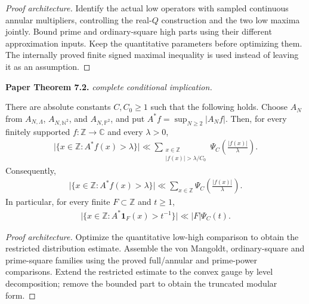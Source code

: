 \begin{proof}[Proof architecture]
\leanok
Identify the actual low operators with sampled continuous annular multipliers, controlling the real-$Q$ construction and the two low maxima jointly. Bound prime and ordinary-square high parts using their different approximation inputs. Keep the quantitative parameters before optimizing them. The internally proved finite signed maximal inequality is used instead of leaving it as an assumption.
\end{proof}

\begin{theorem}
\label{orlicz_maximal}
\leanok
\par\medskip\noindent\textbf{Paper Theorem 7.2.} \textit{complete conditional implication.}\par
There are absolute constants \(C,C_0\geq1\) such that the
following holds. Choose \(A_N\) from \(A_{N,\Lambda}\),
\(A_{N,\mathbb N^2}\), and \(A_{N,\mathbb P^2}\), and put
\(A^*f=\sup_{N\geq2}|A_Nf|\).
Then, for every finitely supported \(f:\mathbb Z\to\mathbb C\) and
every \(\lambda>0\),
\begin{align}
 \bigl|\{x\in\mathbb Z:A^*f(x)>\lambda\}\bigr|
 \ll
 \sum_{\substack{x\in\mathbb Z\\
 |f(x)|>\lambda/C_0}}
 \Psi_C\left(\frac{|f(x)|}{\lambda}\right).
\end{align}
Consequently,
\begin{align}
 \bigl|\{x\in\mathbb Z:A^*f(x)>\lambda\}\bigr|
 \ll
 \sum_{x\in\mathbb Z}
 \Psi_C\left(\frac{|f(x)|}{\lambda}\right).
\end{align}
In particular, for every finite \(F\subset\mathbb Z\) and \(t\geq1\),
\begin{align}
 \bigl|\{x\in\mathbb Z:A^*\mathbf1_F(x)>t^{-1}\}\bigr|
 \ll |F|\Psi_C(t).
\end{align}
\end{theorem}
\begin{proof}[Proof architecture]
\leanok
Optimize the quantitative low-high comparison to obtain the restricted distribution estimate. Assemble the von Mangoldt, ordinary-square and prime-square families using the proved full/annular and prime-power comparisons. Extend the restricted estimate to the convex gauge by level decomposition; remove the bounded part to obtain the truncated modular form.
\end{proof}

